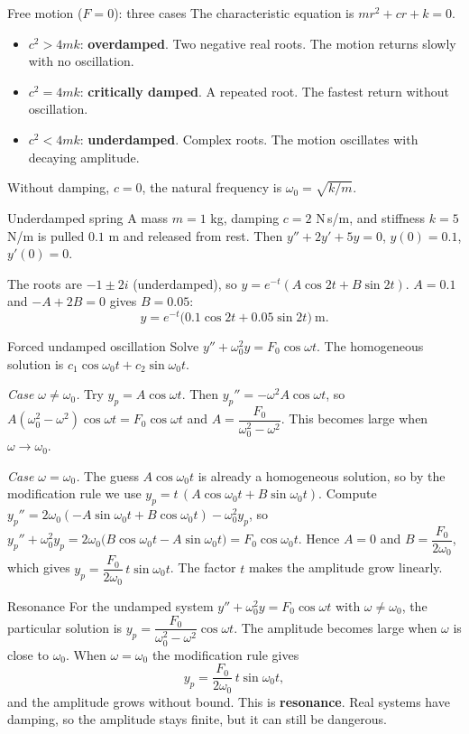 \begin{defbox}{Free motion ($F=0$): three cases}
The characteristic equation is $mr^2 + cr + k = 0$.
\begin{itemize}
  \item $c^2 > 4mk$: \textbf{overdamped}. Two negative real roots. The motion returns slowly with no oscillation.
  \item $c^2 = 4mk$: \textbf{critically damped}. A repeated root. The fastest return without oscillation.
  \item $c^2 < 4mk$: \textbf{underdamped}. Complex roots. The motion oscillates with decaying amplitude.
\end{itemize}
Without damping, $c=0$, the natural frequency is $\omega_0 = \sqrt{k/m}$.
\end{defbox}

\begin{examplebox}{Underdamped spring}
A mass $m=1$ kg, damping $c=2$ N\,s/m, and stiffness $k=5$ N/m is pulled $0.1$ m and released from rest. Then $y'' + 2y' + 5y = 0$, $y(0) = 0.1$, $y'(0)=0$.

The roots are $-1\pm 2i$ (underdamped), so $y = e^{-t}(A\cos 2t + B\sin 2t)$. $A = 0.1$ and $-A + 2B = 0$ gives $B = 0.05$:
\[ y = e^{-t}\big(0.1\cos 2t + 0.05\sin 2t\big)\ \text{m}. \]
\end{examplebox}

\begin{derivbox}{Forced undamped oscillation}
Solve $y'' + \omega_0^2y = F_0\cos\omega t$. The homogeneous solution is $c_1\cos\omega_0t + c_2\sin\omega_0t$.

\emph{Case $\omega\neq\omega_0$.} Try $y_p = A\cos\omega t$. Then $y_p'' = -\omega^2A\cos\omega t$, so $A(\omega_0^2 - \omega^2)\cos\omega t = F_0\cos\omega t$ and $A = \dfrac{F_0}{\omega_0^2 - \omega^2}$. This becomes large when $\omega\to\omega_0$.

\emph{Case $\omega = \omega_0$.} The guess $A\cos\omega_0t$ is already a homogeneous solution, so by the modification rule we use $y_p = t\,(A\cos\omega_0t + B\sin\omega_0t)$. Compute $y_p'' = 2\omega_0(-A\sin\omega_0t + B\cos\omega_0t) - \omega_0^2y_p$, so $y_p'' + \omega_0^2y_p = 2\omega_0\big(B\cos\omega_0t - A\sin\omega_0t\big) = F_0\cos\omega_0t$. Hence $A=0$ and $B = \dfrac{F_0}{2\omega_0}$, which gives $y_p = \dfrac{F_0}{2\omega_0}\,t\sin\omega_0t$. The factor $t$ makes the amplitude grow linearly.
\end{derivbox}

\begin{defbox}{Resonance}
For the undamped system $y'' + \omega_0^2y = F_0\cos\omega t$ with $\omega \neq \omega_0$, the particular solution is $y_p = \dfrac{F_0}{\omega_0^2 - \omega^2}\cos\omega t$. The amplitude becomes large when $\omega$ is close to $\omega_0$. When $\omega = \omega_0$ the modification rule gives
\[ y_p = \frac{F_0}{2\omega_0}\,t\sin\omega_0 t, \]
and the amplitude grows without bound. This is \textbf{resonance}. Real systems have damping, so the amplitude stays finite, but it can still be dangerous.
\end{defbox}

